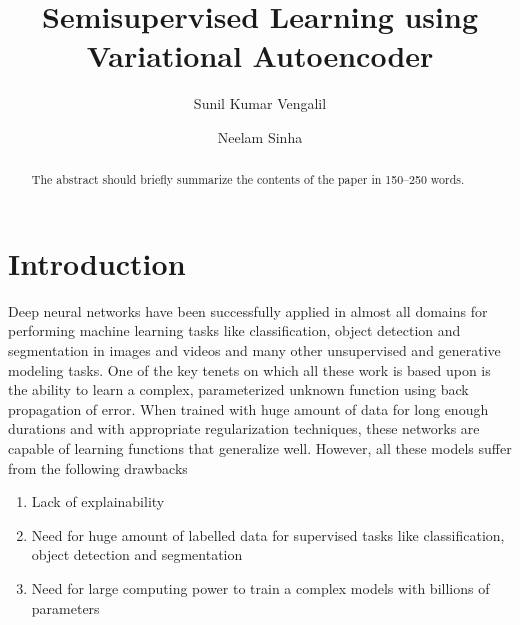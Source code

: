 \documentclass[runningheads]{llncs}
\begin{document}
%
\title{Semisupervised Learning using Variational Autoencoder}
%
%
\author{Sunil Kumar Vengalil \and
Neelam Sinha }
%
%
%
\maketitle              %
%
\begin{abstract}
The abstract should briefly summarize the contents of the paper in
150--250 words.

\end{abstract}
%
%
%
\section{Introduction}
Deep neural networks have been successfully applied in almost all domains for performing machine learning tasks like classification, object detection and segmentation in images and videos and many other unsupervised and generative modeling tasks.
One of the key tenets on which all these work is  based upon  is the ability to learn a complex, parameterized unknown function using back propagation of error.
When trained with huge amount of data for long enough durations and with appropriate regularization techniques, these networks are capable of learning functions that generalize well.
However, all these  models suffer from the following drawbacks
\begin{enumerate}
  \item Lack of explainability
  \item Need for huge amount of labelled data for supervised tasks like classification, object detection and segmentation
  \item Need for large computing power to train a complex models with billions of parameters
\end{enumerate}
\end{document}

